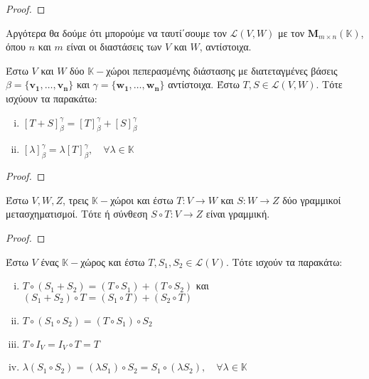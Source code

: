 \begin{proof}
\end{proof}

Αργότερα θα δούμε ότι μπορούμε να ταυτί΄σουμε τον $ \mathcal{L}(V,W) $ με τον $
\textbf{M}_{m \times n}(\mathbb{K}) $, όπου $n$ και $m$ είναι οι διαστάσεις των 
$V$ και $W$, αντίστοιχα. 

\begin{thm}
  Έστω $V$ και $W$ δύο $ \mathbb{K}- $χώροι πεπερασμένης διάστασης με διατεταγμένες 
  βάσεις $ \beta = \{ \mathbf{v_{1}}, \ldots, \mathbf{v_{n}} \} $ και $ \gamma = 
  \{ \mathbf{w_{1}}, \ldots, \mathbf{w_{n}} \}$ αντίστοιχα. Έστω $ T,S \in
  \mathcal{L}(V,W)$. Τότε ισχύουν τα παρακάτω:
  \begin{enumerate}[i)]
    \item $ [T+S]_{\beta}^{\gamma} = [T]_{\beta}^{\gamma} + [S]_{\beta}^{\gamma}$
    \item $ [\lambda]_{\beta}^{\gamma} = \lambda [T]_{\beta}^{\gamma}, \quad \forall
      \lambda \in \mathbb{K} $
  \end{enumerate}
\end{thm}

\begin{proof}
\end{proof}


\begin{thm}
  Έστω $ V,W,Z $, τρεις $ \mathbb{K}- $χώροι και έστω $ T \colon V \to W $ και $ S
  \colon W \to Z $ δύο γραμμικοί μετασχηματισμοί. Τότε ή σύνθεση 
  $ S \circ T \colon V \to Z $ είναι γραμμική.
\end{thm}

\begin{proof}
\end{proof}

\begin{thm}
  Έστω $V$ ένας $ \mathbb{K}- $χώρος και έστω $ T, S_{1}, S_{2} \in \mathcal{L}(V) $. 
  Τότε ισχούν τα παρακάτω:
  \begin{enumerate}[i)]
    \item $ T \circ (S_{1}+S_{2}) = (T \circ S_{1}) + (T \circ S_{2}) $ και $
      (S_{1}+S_{2}) \circ T = (S_{1} \circ T) + (S_{2} \circ T) $
    \item $ T \circ (S_{1} \circ S_{2}) = (T \circ S_{1}) \circ S_{2} $
    \item $ T \circ I_{V} = I_{V} \circ T = T $
    \item $ \lambda (S_{1} \circ S_{2}) = (\lambda S_{1}) \circ S_{2} = S_{1} \circ
      (\lambda S_{2}), \quad \forall \lambda \in \mathbb{K} $
  \end{enumerate}
\end{thm}

